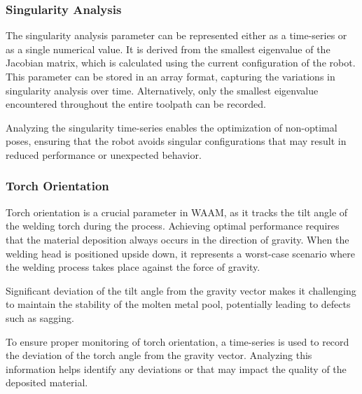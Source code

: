 \subsubsection*{Singularity Analysis}
The singularity analysis parameter can be represented either as a time-series or as a single numerical value. It is derived from the smallest eigenvalue of the Jacobian matrix, which is calculated using the current configuration of the robot. This parameter can be stored in an array format, capturing the variations in singularity analysis over time. Alternatively, only the smallest eigenvalue encountered throughout the entire toolpath can be recorded.

Analyzing the singularity time-series enables the optimization of non-optimal poses, ensuring that the robot avoids singular configurations that may result in reduced performance or unexpected behavior.



\subsubsection*{Torch Orientation}
Torch orientation is a crucial parameter in WAAM, as it tracks the tilt angle of the welding torch during the process. Achieving optimal performance requires that the material deposition always occurs in the direction of gravity. When the welding head is positioned upside down, it represents a worst-case scenario where the welding process takes place against the force of gravity.

Significant deviation of the tilt angle from the gravity vector makes it challenging to maintain the stability of the molten metal pool, potentially leading to defects such as sagging.

To ensure proper monitoring of torch orientation, a time-series is used to record the deviation of the torch angle from the gravity vector. Analyzing this information helps identify any deviations or that may impact the quality of the deposited material.







